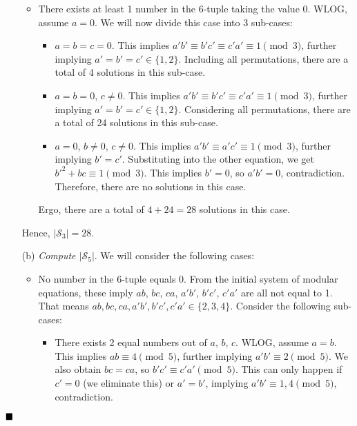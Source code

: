 \documentclass[11pt]{article}
\newenvironment{solution}[1][Solution]{%
  \proof[\normalfont \faPenNib \hspace{0.2cm} \ttfamily \scshape \large #1]%
}{\(\hfill \blacksquare\){\parfillskip0pt\par}}
\theoremstyle{definition}
\begin{document}
\begin{solution}
\begin{enumerate}
\begin{itemize}
                    \item There exists at least 1 number in the 6-tuple taking the value 0. WLOG, assume \(a = 0\). We will now divide this case into 3 sub-cases:

                    \begin{itemize}
                        \item \(a = b = c = 0\). This implies \(a'b' \equiv b'c' \equiv c'a' \equiv 1 \pmod3\), further implying \(a' = b' = c' \in \{1,2\}\). Including all permutations, there are a total of 4 solutions in this sub-case.

                        \item \(a = b = 0\), \(c \neq 0\). This implies \(a'b' \equiv b'c' \equiv c'a' \equiv 1 \pmod3\), further implying \(a' = b' = c' \in \{1,2\}\). Considering all permutations, there are a total of 24 solutions in this sub-case.

                        \item \(a = 0\), \(b \neq 0\), \(c \neq 0\). This implies \(a'b' \equiv a'c' \equiv 1 \pmod3\), further implying \(b' = c'\). Substituting into the other equation, we get \(b'^2 + bc \equiv 1 \pmod3\). This implies \(b' = 0\), so \(a'b' = 0\), contradiction. Therefore, there are no solutions in this case.
                    \end{itemize}

                    Ergo, there are a total of \(4 + 24 = 28\) solutions in this case.
                \end{itemize}

                Hence, \(\left|\mathcal{S}_{3}\right| = 28\).

                \item[(b)] \textit{Compute \(\left|\mathcal{S}_{5}\right|\)}. We will consider the following cases:

                \begin{itemize}
                    \item No number in the 6-tuple equals 0. From the initial system of modular equations, these imply \(ab\), \(bc\), \(ca\), \(a'b'\), \(b'c'\), \(c'a'\) are all not equal to 1. That means \(ab,bc,ca,a'b',b'c',c'a' \in \{2,3,4\}\). Consider the following sub-cases:

                    \begin{itemize}
                        \item There exists 2 equal numbers out of \(a\), \(b\), \(c\). WLOG, assume \(a = b\). This implies \(ab \equiv 4 \pmod5\), further implying \(a'b' \equiv 2 \pmod5\). We also obtain \(bc = ca\), so \(b'c' \equiv c'a' \pmod5\). This can only happen if \(c' = 0\) (we eliminate this) or \(a' = b'\), implying \(a'b' \equiv 1,4 \pmod5\), contradiction.


\end{itemize}
\end{itemize}
\end{enumerate}
\end{solution}
\end{document}
